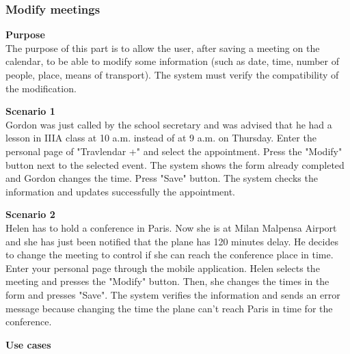 \documentclass{article}
\begin{document}
	\subsubsection{Modify meetings}
	
	\bigskip
	\noindent
	\textbf{Purpose} \\
	The purpose of this part is to allow the user, after saving a meeting on the calendar, to be able to modify some information (such as date, time, number of people, place, means of transport). The system must verify the compatibility of the modification.
	
	\bigskip
	\noindent
	\textbf{Scenario 1} \\
	Gordon was just called by the school secretary and was advised that he had a lesson in IIIA class at 10 a.m. instead of at 9 a.m. on Thursday. Enter the personal page of "Travlendar +" and select the appointment. Press the "Modify" button next to the selected event. The system shows the form already completed and Gordon changes the time. Press  "Save" button. The system checks the information and updates successfully the appointment.
	
	\bigskip
	\noindent
	\textbf{Scenario 2} \\
	Helen has to hold a conference in Paris. Now she is at Milan Malpensa Airport and she has just been notified that the plane has 120 minutes delay. He decides to change the meeting to control if she can reach the conference place in time. Enter your personal page through the mobile application. Helen selects the meeting and presses the "Modify" button. Then, she changes the times in the form and presses "Save". The system verifies the information and sends an error message because changing the time the plane can’t  reach Paris in time for the conference.
	
	\bigskip
	\noindent
	\textbf{Use cases} \\
	
\end{document}
